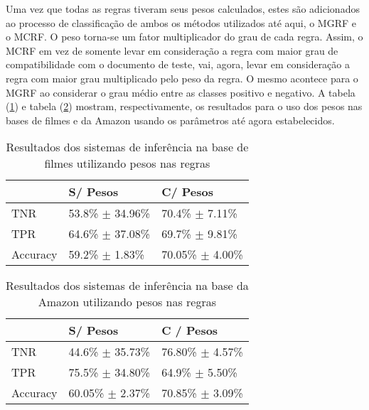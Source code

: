 Uma vez que todas as regras tiveram seus pesos calculados, estes são adicionados ao processo de classificação de ambos os métodos utilizados até aqui, o MGRF e o MCRF. O peso torna-se um fator multiplicador do grau de cada regra. Assim, o MCRF em vez de somente levar em consideração a regra com maior grau de compatibilidade com o documento de teste, vai, agora, levar em consideração a regra com maior grau multiplicado pelo peso da regra. O mesmo acontece para o MGRF ao considerar o grau médio entre as classes positivo e negativo. A tabela (\ref{table:movies2_pesos}) e tabela (\ref{table:amazon2_pesos}) mostram, respectivamente, os resultados para o uso dos pesos nas bases de filmes e da Amazon usando os parâmetros até agora estabelecidos. 

\begin{table}[!h]
    \begin{tabular}{lll}
 	~         			& S/ Pesos 								& C/ Pesos \\ \hline
    TNR 				& 53.8\% $\pm$ 34.96\%   	& 70.4\% $\pm$ 7.11\%    \\
    TPR    			& 64.6\% $\pm$ 37.08\%   	& 69.7\% $\pm$ 9.81\%   \\   
    Accuracy  		& 59.2\% $\pm$ 1.83\%    	& 70.05\% $\pm$ 4.00\%    \\
    \end{tabular}
    \caption{Resultados dos sistemas de inferência na base de filmes utilizando pesos nas regras}
	\label{table:movies2_pesos}
\end{table}

%
%
%

\begin{table}[!h]
    \begin{tabular}{lll}
    ~         			& S/ Pesos									& C / Pesos \\ \hline
    TNR 				& 44.6\% $\pm$ 35.73\%    	& 76.80\% $\pm$ 4.57\%    \\
    TPR    			& 75.5\% $\pm$ 34.80\%    	& 64.9\% $\pm$ 5.50\%    \\
    Accuracy  		& 60.05\% $\pm$ 2.37\%    	& 70.85\% $\pm$ 3.09\%   \\
    \end{tabular}
    \caption{Resultados dos sistemas de inferência na base da Amazon utilizando pesos nas regras}
	\label{table:amazon2_pesos}
\end{table}

